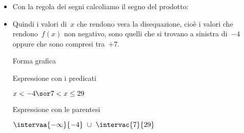 \begin{esempio}
\begin{itemize}
\begin{itemize}
\end{itemize}
 \item Con la regola dei segni calcoliamo il segno del prodotto:
\begin{inaccessibleblock}
  \begin{center}
  \segnofrazionea
  \end{center}
\end{inaccessibleblock}
 \item 
 Quindi i valori di~\(x\) che rendono vera la disequazione, cioè 
i valori  che rendono~\(f(x)\) non negativo, sono quelli 
  che si trovano a sinistra di~\(-4\) oppure che sono compresi 
  tra~\(+7\).\\

  \begin{minipage}{.32\textwidth}
  \vspace{.7em}
  Forma grafica\\ [-.8em]
  
\begin{inaccessibleblock}
  \begin{center}
  \solfrazionea
  \end{center}
\end{inaccessibleblock}
\vspace{.1em}

  \end{minipage}
  \begin{minipage}{.32\textwidth}
  Espressione con i predicati\\[-.3em]
  
 \begin{center}
  \(x < -4 \sor 7 < x \le 29\)
  \vspace{1em}
 \end{center}
  \end{minipage}
  \begin{minipage}{.32\textwidth}
  Espressione con le parentesi\\[-.3em]
  
 \begin{center}
  \(\intervaa{-\infty}{-4}~\cup~\intervac{7}{29}\)
  \vspace{.8em}
 \end{center}
  \end{minipage}
  
\end{itemize}

\end{esempio}

